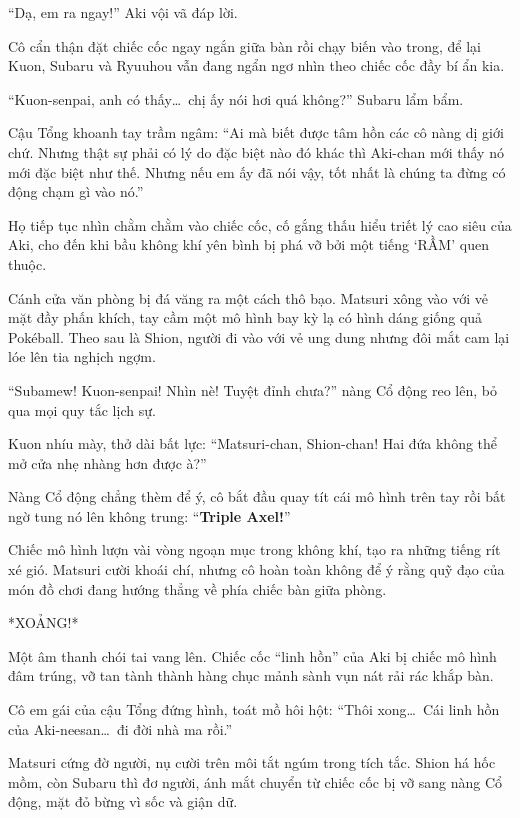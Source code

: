 \documentclass[../main.tex]{subfiles}
\begin{document}
``Dạ, em ra ngay!'' Aki vội vã đáp lời.

Cô cẩn thận đặt chiếc cốc ngay ngắn giữa bàn rồi chạy biến vào trong, để lại Kuon, Subaru và Ryuuhou vẫn đang ngẩn ngơ nhìn theo chiếc cốc đầy bí ẩn kia.

``Kuon-senpai, anh có thấy\dots\ chị ấy nói hơi quá không?'' Subaru lẩm bẩm.

Cậu Tổng khoanh tay trầm ngâm: ``Ai mà biết được tâm hồn các cô nàng dị giới chứ. Nhưng thật sự phải có lý do đặc biệt nào đó khác thì Aki-chan mới thấy nó mới đặc biệt như thế. Nhưng nếu em ấy đã nói vậy, tốt nhất là chúng ta đừng có động chạm gì vào nó.''

Họ tiếp tục nhìn chằm chằm vào chiếc cốc, cố gắng thấu hiểu triết lý cao siêu của Aki, cho đến khi bầu không khí yên bình bị phá vỡ bởi một tiếng `RẦM' quen thuộc.

Cánh cửa văn phòng bị đá văng ra một cách thô bạo. Matsuri xông vào với vẻ mặt đầy phấn khích, tay cầm một mô hình bay kỳ lạ có hình dáng giống quả Pokéball. Theo sau là Shion, người đi vào với vẻ ung dung nhưng đôi mắt cam lại lóe lên tia nghịch ngợm.


``Subamew! Kuon-senpai! Nhìn nè! Tuyệt đỉnh chưa?'' nàng Cổ động reo lên, bỏ qua mọi quy tắc lịch sự.

Kuon nhíu mày, thở dài bất lực: ``Matsuri-chan, Shion-chan! Hai đứa không thể mở cửa nhẹ nhàng hơn được à?''

Nàng Cổ động chẳng thèm để ý, cô bắt đầu quay tít cái mô hình trên tay rồi bất ngờ tung nó lên không trung: ``\textbf{Triple Axel!}''

Chiếc mô hình lượn vài vòng ngoạn mục trong không khí, tạo ra những tiếng rít xé gió. Matsuri cười khoái chí, nhưng cô hoàn toàn không để ý rằng quỹ đạo của món đồ chơi đang hướng thẳng về phía chiếc bàn giữa phòng.

*XOẢNG!*

Một âm thanh chói tai vang lên. Chiếc cốc ``linh hồn'' của Aki bị chiếc mô hình đâm trúng, vỡ tan tành thành hàng chục mảnh sành vụn nát rải rác khắp bàn.


Cô em gái của cậu Tổng đứng hình, toát mồ hôi hột: ``Thôi xong\dots\ Cái linh hồn của Aki-neesan\dots\ đi đời nhà ma rồi.''

Matsuri cứng đờ người, nụ cười trên môi tắt ngúm trong tích tắc. Shion há hốc mồm, còn Subaru thì đơ người, ánh mắt chuyển từ chiếc cốc bị vỡ sang nàng Cổ động, mặt đỏ bừng vì sốc và giận dữ.
\end{document}
